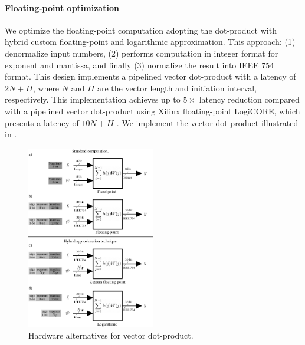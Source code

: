\paragraph{Floating-point optimization}
We optimize the floating-point computation adopting the dot-product with hybrid custom floating-point and logarithmic approximation\cite{nevarez2021accelerating}. This approach: (1) denormalize input numbers, (2) performs computation in integer format for exponent and mantissa, and finally (3) normalize the result into IEEE 754 format. This design implements a pipelined vector dot-product with a latency of $2N+II$, where $N$ and $II$ are the vector length and initiation interval, respectively. This implementation achieves up to $5\times$ latency reduction compared with a pipelined vector dot-product using Xilinx floating-point LogiCORE, which presents a latency of $10N+II$ \cite{nevarez2021accelerating}. We implement the vector dot-product illustrated in .

\begin{figure}[t!]
	\centering
	\includegraphics[width=0.5\textwidth]{../figures/dot-product_unit.pdf}
	\caption{Hardware alternatives for vector dot-product.}
	\label{fig:dot_product}
\end{figure}


